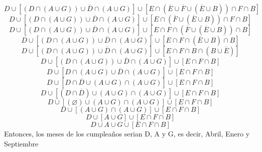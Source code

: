 \documentclass[letterpaper,10pt]{article}
\begin{document}
\begin{equation*}
    D \cup [(D \cap (A \cup G)) \cup \overline{D} \cap (A \cup G)] \cup [E \cap (\overline{E} \cup \overline{F} \cup (\overline{E} \cup B)) \cap F \cap B]
\end{equation*}
\begin{equation*}
    D \cup [(D \cap (A \cup G)) \cup \overline{D} \cap (A \cup G)] \cup [E \cap (\overline{F} \cup (\overline{E} \cup B)) \cap F \cap B]
\end{equation*}
\begin{equation*}
    D \cup [(D \cap (A \cup G)) \cup \overline{D} \cap (A \cup G)] \cup [E \cap F \cap (\overline{F} \cup (\overline{E} \cup B)) \cap B]
\end{equation*}
\begin{equation*}
    D \cup [(D \cap (A \cup G)) \cup \overline{D} \cap (A \cup G)] \cup [E \cap F \cap (\overline{E} \cup B) \cap B]
\end{equation*}
\begin{equation*}
    D \cup [(D \cap (A \cup G)) \cup \overline{D} \cap (A \cup G)] \cup [E \cap F \cap B \cap (B \cup \overline{E})]
\end{equation*}
\begin{equation*}
    D \cup [(D \cap (A \cup G)) \cup \overline{D} \cap (A \cup G)] \cup [E \cap F \cap B]
\end{equation*}
\begin{equation*}
    D \cup [D \cap (A \cup G) \cup \overline{D} \cap (A \cup G)] \cup [E \cap F \cap B]
\end{equation*}
\begin{equation*}
    D \cup [D \cap \overline{D} \cup (A \cup G)  \cap (A \cup G)] \cup [E \cap F \cap B]
\end{equation*}
\begin{equation*}
    D \cup [(D \cap \overline{D}) \cup (A \cup G)  \cap (A \cup G)] \cup [E \cap F \cap B]
\end{equation*}
\begin{equation*}
    D \cup [(\varnothing) \cup (A \cup G)  \cap (A \cup G)] \cup [E \cap F \cap B]
\end{equation*}
\begin{equation*}
    D \cup [(A \cup G)  \cap (A \cup G)] \cup [E \cap F \cap B]
\end{equation*}
\begin{equation*}
    D \cup [A \cup G] \cup [E \cap F \cap B]
\end{equation*}
\begin{equation*}
    D \cup A \cup G \cup [E \cap F \cap B]
\end{equation*}
\vspace{0.5cm}
\newline
Entonces, los meses de los cumpleaños serian D, A y G, es decir, Abril, Enero y Septiembre
\end{document}
